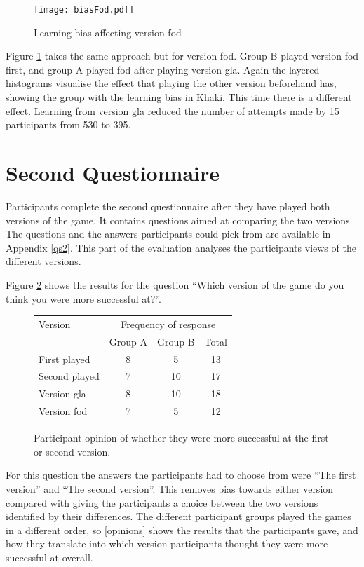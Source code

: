 \documentclass[12pt,a4paper,twoside,openright]{report}
\begin{document}
\begin{figure}
\centerline{\texttt{[image: biasFod.pdf]}}
\caption{Learning bias affecting version fod}
\label{fodBias}
\end{figure}

Figure \ref{fodBias} takes the same approach but for version fod. Group B played version fod first, and group A played fod after playing version gla. Again the layered histograms visualise the effect that playing the other version beforehand has, showing the group with the learning bias in Khaki.
This time there is a different effect. Learning from version gla reduced the number of attempts made by 15 participants from 530 to 395.





\section{Second Questionnaire}
\label{q2}

Participants complete the second questionnaire after they have played both versions of the game. It contains questions aimed at comparing the two versions. The questions and the answers participants could pick from are available in Appendix \ref{qs2}.
This part of the evaluation analyses the participants views of the different versions.

Figure \ref{successfull} shows the results for the question ``Which version of the game do you think you were more successful at?''. 
\begin{figure}[tbh]
    \begin{center}
    \begin{tabular}{ |p{6cm}|c|c|c| }
      \hline
    Version& \multicolumn{3}{|c|}{Frequency of response} \\ \cline{2-4}
    & Group A& Group B&Total\\ \hline\hline
    First played   & 8 & 5  & 13 \\ \hline
    Second played  & 7 & 10 & 17 \\ \hline\hline
    Version gla    & 8 & 10 & 18 \\ \hline
    Version fod    & 7 & 5  & 12 \\ \hline
    \end{tabular}
    \end{center}
    \caption{Participant opinion of whether they were more successful at the first or second version.}
    \label{successfull}
\end{figure}
For this question the answers the participants had to choose from were ``The first version'' and ``The second version''. This removes bias towards either version compared with giving the participants a choice between the two versions identified by their differences.
The different participant groups played the games in a different order, so \ref{opinions} shows the results that the participants gave, and how they translate into which version participants thought they were more successful at overall.
\end{document}

